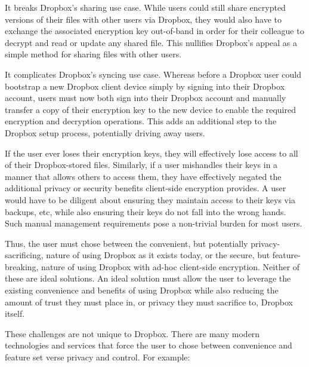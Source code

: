 \begin{packed_enum}
\item It breaks Dropbox's sharing use case. While users could still
  share encrypted versions of their files with other users via
  Dropbox, they would also have to exchange the associated encryption
  key out-of-band in order for their colleague to decrypt and read or
  update any shared file. This nullifies Dropbox's appeal as a simple
  method for sharing files with other users.
\item It complicates Dropbox's syncing use case. Whereas before a
  Dropbox user could bootstrap a new Dropbox client device simply by
  signing into their Dropbox account, users must now both sign into
  their Dropbox account and manually transfer a copy of their
  encryption key to the new device to enable the required encryption
  and decryption operations. This adds an additional step to the
  Dropbox setup process, potentially driving away users.
\item If the user ever loses their encryption keys, they will
  effectively lose access to all of their Dropbox-stored
  files. Similarly, if a user mishandles their keys in a manner that
  allows others to access them, they have effectively negated the
  additional privacy or security benefits client-side encryption
  provides. A user would have to be diligent about ensuring they
  maintain access to their keys via backups, etc, while also ensuring
  their keys do not fall into the wrong hands. Such manual management
  requirements pose a non-trivial burden for most users.
\end{packed_enum}

Thus, the user must chose between the convenient, but potentially
privacy-sacrificing, nature of using Dropbox as it exists today, or
the secure, but feature-breaking, nature of using Dropbox with ad-hoc
client-side encryption. Neither of these are ideal solutions. An ideal
solution must allow the user to leverage the existing convenience and
benefits of using Dropbox while also reducing the amount of trust they
must place in, or privacy they must sacrifice to, Dropbox itself.

These challenges are not unique to Dropbox. There are many modern
technologies and services that force the user to chose between
convenience and feature set verse privacy and control. For example:

